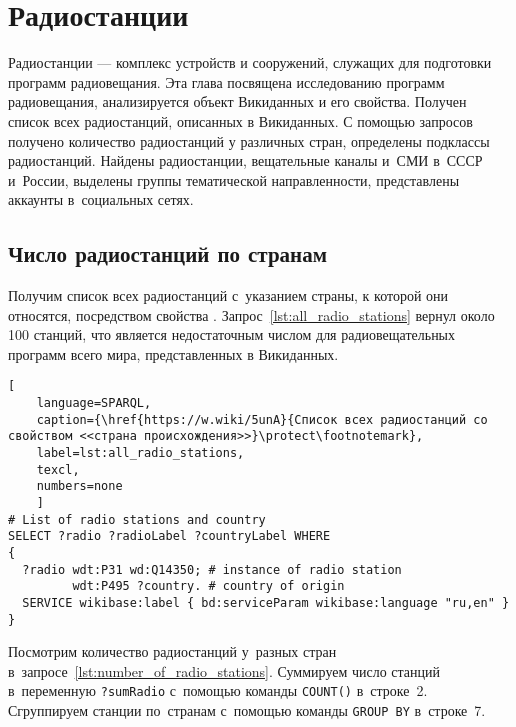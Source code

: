 \chapter[Радиостанции]{Радиостанции}
\label{ch:radio-station}

Радиостанции --- комплекс устройств и сооружений, служащих для подготовки программ радиовещания. 
Эта глава посвящена исследованию программ радиовещания, 
анализируется объект Викиданных  и его свойства. 
Получен список всех радиостанций, описанных в Викиданных. 
С помощью запросов получено количество радиостанций у различных стран, 
определены подклассы радиостанций. 
Найдены радиостанции, вещательные каналы и~СМИ в~СССР и~России, 
выделены группы тематической направленности, 
представлены аккаунты в~социальных сетях.

\section{Число радиостанций по странам}

Получим список всех радиостанций с~указанием страны, к которой они относятся, 
посредством свойства . 
Запрос~\ref{lst:all_radio_stations} вернул около 100 станций, 
что является недостаточным числом для радиовещательных программ всего мира, представленных в Викиданных.

\begin{lstlisting}[ 
    language=SPARQL,
    caption={\href{https://w.wiki/5unA}{Cписок всех радиостанций со свойством <<страна происхождения>>}\protect\footnotemark},
    label=lst:all_radio_stations,
    texcl,
    numbers=none
    ]
# List of radio stations and country
SELECT ?radio ?radioLabel ?countryLabel WHERE
{
  ?radio wdt:P31 wd:Q14350; # instance of radio station
         wdt:P495 ?country. # country of origin
  SERVICE wikibase:label { bd:serviceParam wikibase:language "ru,en" }
}
\end{lstlisting}%


Посмотрим количество радиостанций у~разных стран в~запросе~\ref{lst:number_of_radio_stations}.
Суммируем число станций в~переменную \lstinline|?sumRadio| 
с~помощью команды \lstinline|COUNT()| в~строке~2. 
Сгруппируем станции по~странам с~помощью команды \lstinline|GROUP BY| в~строке~7.



